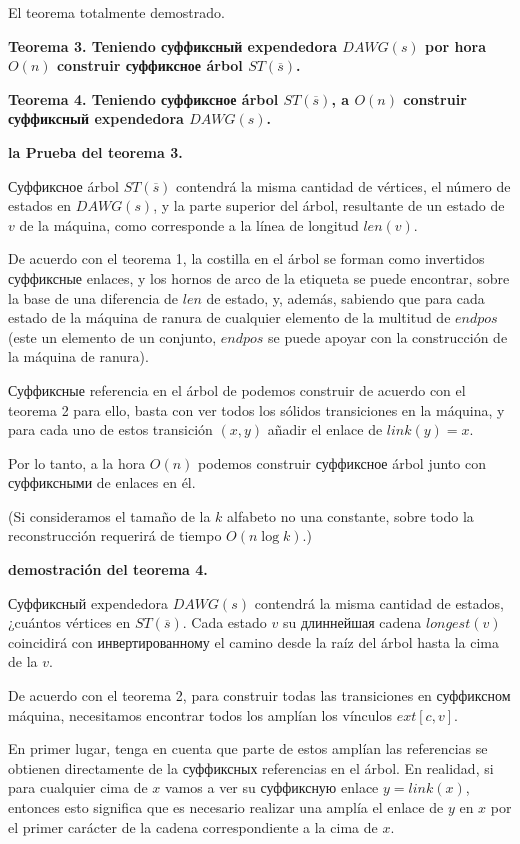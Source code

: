 El teorema totalmente demostrado.

\bf{Teorema 3}. Teniendo суффиксный expendedora $DAWG(s)$ por hora $O(n)$ construir суффиксное árbol $ST(\overline{s})$.

\bf{Teorema 4}. Teniendo суффиксное árbol $ST(\overline{s})$, a $O(n)$ construir суффиксный expendedora $DAWG(s)$.

\bf{la Prueba del teorema 3}.

Суффиксное árbol $ST(\overline{s})$ contendrá la misma cantidad de vértices, el número de estados en $DAWG(s)$, y la parte superior del árbol, resultante de un estado de $v$ de la máquina, como corresponde a la línea de longitud $len(v)$.

De acuerdo con el teorema 1, la costilla en el árbol se forman como invertidos суффиксные enlaces, y los hornos de arco de la etiqueta se puede encontrar, sobre la base de una diferencia de $len$ de estado, y, además, sabiendo que para cada estado de la máquina de ranura de cualquier elemento de la multitud de $endpos$ (este un elemento de un conjunto, $endpos$ se puede apoyar con la construcción de la máquina de ranura).

Суффиксные referencia en el árbol de podemos construir de acuerdo con el teorema 2 para ello, basta con ver todos los sólidos transiciones en la máquina, y para cada uno de estos transición $(x,y)$ añadir el enlace de $link(y) = x$.

Por lo tanto, a la hora $O(n)$ podemos construir суффиксное árbol junto con суффиксными de enlaces en él.

(Si consideramos el tamaño de la $k$ alfabeto no una constante, sobre todo la reconstrucción requerirá de tiempo $O (n \log k)$.)

\bf{demostración del teorema 4}.

Суффиксный expendedora $DAWG(s)$ contendrá la misma cantidad de estados, ¿cuántos vértices en $ST(\overline{s})$. Cada estado $v$ su длиннейшая cadena $longest(v)$ coincidirá con инвертированному el camino desde la raíz del árbol hasta la cima de la $v$.

De acuerdo con el teorema 2, para construir todas las transiciones en суффиксном máquina, necesitamos encontrar todos los amplían los vínculos $ext[c,v]$.

En primer lugar, tenga en cuenta que parte de estos amplían las referencias se obtienen directamente de la суффиксных referencias en el árbol. En realidad, si para cualquier cima de $x$ vamos a ver su суффиксную enlace $y = link(x)$, entonces esto significa que es necesario realizar una amplía el enlace de $y$ en $x$ por el primer carácter de la cadena correspondiente a la cima de $x$.

